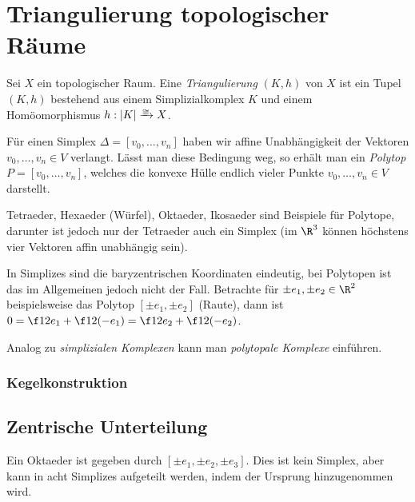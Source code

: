 \section{Triangulierung topologischer Räume}


\begin{df}
	Sei $X$ ein topologischer Raum.
	Eine \emph{Triangulierung} $(K, h)$ von $X$ ist ein Tupel $(K, h)$ bestehend aus einem Simplizialkomplex $K$ und einem Homöomorphismus $h: |K| \homto X$.
\end{df}


\begin{ex}
	Für einen Simplex $\Delta = [v_0, \dotsc, v_n]$ haben wir affine Unabhängigkeit der Vektoren $v_0, \dotsc, v_n \in V$ verlangt.
	Lässt man diese Bedingung weg, so erhält man ein \emph{Polytop} $P = [v_0, \dotsc, v_n]$, welches die konvexe Hülle endlich vieler Punkte $v_0, \dotsc, v_n \in V$ darstellt.

	Tetraeder, Hexaeder (Würfel), Oktaeder, Ikosaeder sind Beispiele für Polytope, darunter ist jedoch nur der Tetraeder auch ein Simplex (im $\R^3$ können höchstens vier Vektoren affin unabhängig sein).

	In Simplizes sind die baryzentrischen Koordinaten eindeutig, bei Polytopen ist das im Allgemeinen jedoch nicht der Fall.
	Betrachte für $\pm e_1, \pm e_2 \in \R^2$ beispielsweise das Polytop $[\pm e_1, \pm e_2]$ (Raute), dann ist $0 = \f 12 e_1 + \f 12 (-e_1) = \f 12 e_2 + \f 12 (-e_2)$.

	Analog zu \emph{simplizialen Komplexen} kann man \emph{polytopale Komplexe} einführen.
\end{ex}

\subsubsection{Kegelkonstruktion}


\subsection{Zentrische Unterteilung}



Ein Oktaeder ist gegeben durch $[\pm e_1, \pm e_2, \pm e_3]$.
Dies ist kein Simplex, aber kann in acht Simplizes aufgeteilt werden, indem der Ursprung hinzugenommen wird.

